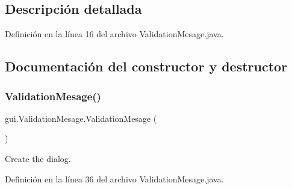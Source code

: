 \subsection{Descripción detallada}


Definición en la línea 16 del archivo Validation\+Mesage.\+java.



\subsection{Documentación del constructor y destructor}
\mbox{\label{classgui_1_1_validation_mesage_a647fd86859f2d4c283aaf6ce04075179}} 
\subsubsection{\texorpdfstring{ValidationMesage()}{ValidationMesage()}}
{\footnotesize\ttfamily gui.\+Validation\+Mesage.\+Validation\+Mesage (\begin{DoxyParamCaption}{ }\end{DoxyParamCaption})}



Create the dialog. 



Definición en la línea 36 del archivo Validation\+Mesage.\+java.


